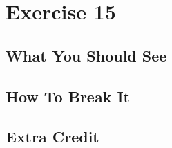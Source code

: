 \chapter{Exercise 15}


\section{What You Should See}


\section{How To Break It}


\section{Extra Credit}



